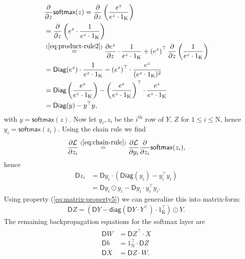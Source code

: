 \documentclass[twoside,11pt]{article}
\newcommand{\const}[1]{\ensuremath{\mathrm{#1}}} %
\newcommand{\func}[1]{\ensuremath{\textsf{#1}}} %
\newcommand{\Gradient}{\textsf{D}}
\newcommand{\Derivative}[2]{\ensuremath{\frac{\partial #1}{\partial #2}}}
\newcommand{\Partial}[1]{\frac{\partial}{\partial #1}}
\begin{document}
\begin{align} \label{eq:softmax-derivation}
\begin{split}
    &\Partial{z} \func{softmax}(z) =
    \Partial{z} \left( \frac{e^z}{e^z \cdot 1_\const{K}} \right)
    \\
    & = \Partial{z} \left( e^z \cdot \frac{1}{e^z \cdot 1_\const{K}} \right)
    \\
    & \overset{(\ref{eq:product-rule2})}{=}
    \Derivative{e^z}{z} \cdot \frac{1}{e^z \cdot 1_\const{K}} +
    \left( e^z \right)^\top
    \Partial{z} \left( \frac{1}{e^z \cdot 1_\const{K}} \right)
    \\
    &= 
    \func{Diag}(e^z) \cdot \frac{1}{e^z \cdot 1_\const{K}} -
    (e^z)^\top \cdot \frac{e^z}{(e^z \cdot 1_\const{K})^2}
    \\
    &= 
    \func{Diag}\left(\frac{e^z}{e^z \cdot 1_\const{K}}\right) -
    \left(\frac{e^z}{e^z \cdot 1_\const{K}}\right)^\top \cdot
    \frac{e^z}{e^z \cdot 1_\const{K}}
    \\
    &= \func{Diag}(y) -y^\top y,
\end{split}    
\end{align}
with $y = \func{softmax}(z)$.
Now let $y_i, z_i$ be the $i^\text{th}$ row of $Y$, $Z$ for $1 \leq i \leq \const{N}$, hence $y_i = \func{softmax}(z_i)$.
Using the chain rule we find
\[
  \Derivative{\mathcal{L}}{z_i} 
  \overset{(\ref{eq:chain-rule})}{=} 
  \Derivative{\mathcal{L}}{y_i} \Partial{z_i} \func{softmax}(z_i),
\]
hence
\begin{align*}
  \Gradient{z_i} &= \Gradient{y_i} \cdot 
    \left( 
       \func{Diag}(y_i) - y_i^\top y_i
    \right)
  \\  
  &= \Gradient y_i \odot y_i - \Gradient y_i \cdot y_i^\top y_i.
\end{align*}
Using property (\ref{eq:matrix-property5})
we can generalize this into matrix-form:
\begin{align} \label{eq:softmax-layer-backprop1}
  \Gradient Z = (\Gradient Y - \func{diag}(\Gradient Y \cdot Y^\top) \cdot 1_\const{K}^\top) \odot Y.
\end{align}
The remaining backpropagation equations for the softmax layer are
\begin{align} \label{eq:softmax-layer-backprop2}
\begin{split}
\Gradient W &= \Gradient Z^\top \cdot X
\\
\Gradient b &= 1_\const{N}^\top \cdot \Gradient Z
\\
\Gradient X &= \Gradient Z \cdot W.
\end{split}
\end{align}
\end{document}
